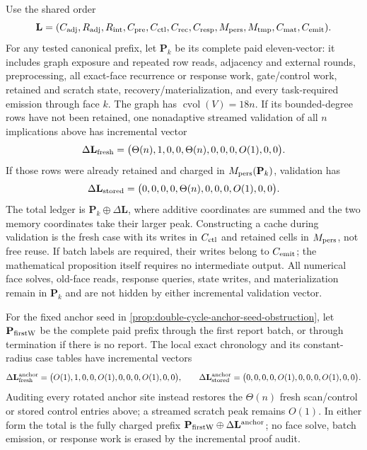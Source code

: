 \begin{remark}
Use the shared order
\begin{equation*}
 \mathbf L=(C_{\rm adj},R_{\rm adj},R_{\rm int},C_{\rm pre},C_{\rm ctl},
 C_{\rm rec},C_{\rm resp},M_{\rm pers},M_{\rm tmp},C_{\rm mat},C_{\rm emit}).
\end{equation*}
For any tested canonical prefix, let $\mathbf P_k$ be its complete paid
eleven-vector: it includes graph exposure and repeated row reads, adjacency
and external rounds, preprocessing, all exact-face recurrence or response
work, gate/control work, retained and scratch state, recovery/materialization,
and every task-required emission through face $k$.  The graph has
$\operatorname{cvol}(V)=18n$.  If its bounded-degree rows have not been
retained, one nonadaptive streamed validation of all $n$ implications above
has incremental vector
\begin{equation}
 \Delta\mathbf L_{\rm fresh}
 =\bigl(\Theta(n),1,0,0,\Theta(n),0,0,0,O(1),0,0\bigr).
 \label{eq:double-cycle-feed-fresh-audit-vector}
\end{equation}
If those rows were already retained and charged in
$M_{\rm pers}(\mathbf P_k)$, validation has
\begin{equation}
\Delta\mathbf L_{\rm stored}
 =\bigl(0,0,0,0,\Theta(n),0,0,0,O(1),0,0\bigr).
 \label{eq:double-cycle-feed-stored-audit-vector}
\end{equation}
The total ledger is $\mathbf P_k\oplus\Delta\mathbf L$, where additive
coordinates are summed and the two memory coordinates take their larger
peak.  Constructing a cache during validation is the fresh case with its
writes in $C_{\rm ctl}$ and retained cells in $M_{\rm pers}$, not free reuse.
If batch labels are required, their writes belong to $C_{\rm emit}$; the
mathematical proposition itself requires no intermediate output.  All
numerical face solves, old-face reads, response queries, state writes, and
materialization remain in $\mathbf P_k$ and are not hidden by either
incremental validation vector.

For the fixed anchor seed in
\cref{prop:double-cycle-anchor-seed-obstruction}, let
$\mathbf P_{\rm firstW}$ be the complete paid prefix through the first report
batch, or through termination if there is no report.  The local exact
chronology and its constant-radius case tables have incremental vectors
\begin{equation}
 \Delta\mathbf L^{\rm anchor}_{\rm fresh}
 =\bigl(O(1),1,0,0,O(1),0,0,0,O(1),0,0\bigr),
 \qquad
 \Delta\mathbf L^{\rm anchor}_{\rm stored}
 =\bigl(0,0,0,0,O(1),0,0,0,O(1),0,0\bigr).
 \label{eq:double-cycle-anchor-audit-vectors}
\end{equation}
Auditing every rotated anchor site instead restores the $\Theta(n)$ fresh
scan/control or stored control entries above; a streamed scratch peak remains
$O(1)$.  In either form the total is the fully charged prefix
$\mathbf P_{\rm firstW}\oplus\Delta\mathbf L^{\rm anchor}$; no face solve,
batch emission, or response work is erased by the incremental proof audit.


\end{remark}

